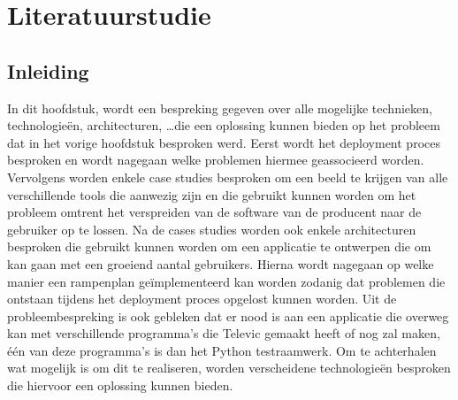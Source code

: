 \chapter{Literatuurstudie}
\section{Inleiding}
In dit hoofdstuk, wordt een bespreking gegeven over alle mogelijke technieken, technologieën, architecturen, \ldots die een oplossing kunnen bieden op het probleem dat in het vorige hoofdstuk besproken werd.
Eerst wordt het deployment proces besproken en wordt nagegaan welke problemen hiermee geassocieerd worden.
Vervolgens worden enkele case studies besproken om een beeld te krijgen van alle verschillende tools die aanwezig zijn en die gebruikt kunnen worden om het probleem omtrent het verspreiden van de software van de producent naar de gebruiker op te lossen.
Na de cases studies worden ook enkele architecturen besproken die gebruikt kunnen worden om een applicatie te ontwerpen die om kan gaan met een groeiend aantal gebruikers.
Hierna wordt nagegaan op welke manier een rampenplan geïmplementeerd kan worden zodanig dat problemen die ontstaan tijdens het deployment proces opgelost kunnen worden.
Uit de probleembespreking is ook gebleken dat er nood is aan een applicatie die overweg kan met verschillende programma's die Televic gemaakt heeft of nog zal maken, één van deze programma's is dan het Python testraamwerk.
Om te achterhalen wat mogelijk is om dit te realiseren, worden verscheidene technologieën besproken die hiervoor een oplossing kunnen bieden.

